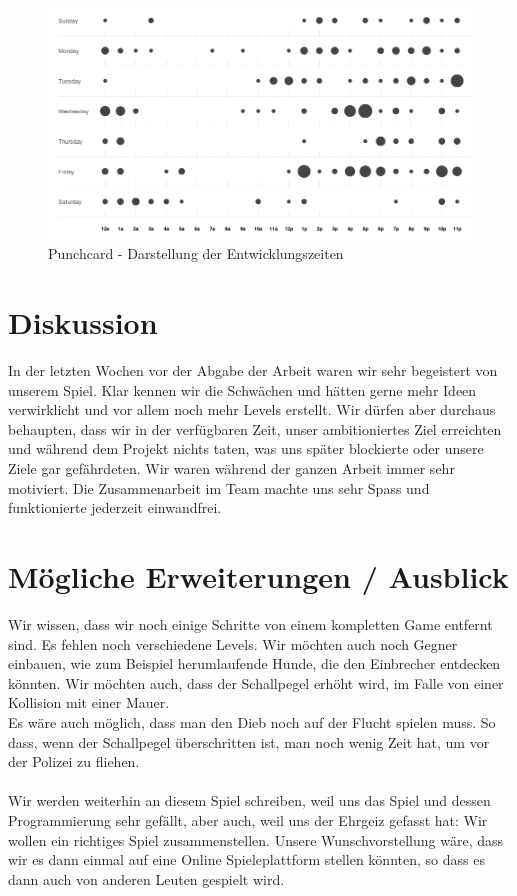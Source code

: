 \documentclass[11pt,a4paper]{scrbook}
\begin{document}
\begin{figure}[h]
\centering
\includegraphics[scale=0.4]{img/punchcard.png}
\caption{Punchcard - Darstellung der Entwicklungszeiten}
\label{fig:punchcard}
\end{figure}
 
\chapter{Diskussion}
In der letzten Wochen vor der Abgabe der Arbeit waren wir sehr begeistert von unserem Spiel. Klar kennen wir die Schwächen und hätten gerne mehr Ideen verwirklicht und vor allem noch mehr Levels erstellt. Wir dürfen aber durchaus behaupten, dass wir in der verfügbaren Zeit, unser ambitioniertes Ziel erreichten und während dem Projekt nichts taten, was uns später blockierte oder unsere Ziele gar gefährdeten. Wir waren während der ganzen Arbeit immer sehr motiviert. Die Zusammenarbeit im Team machte uns sehr Spass und funktionierte jederzeit einwandfrei. 


\chapter{Mögliche Erweiterungen / Ausblick}
Wir wissen, dass wir noch einige Schritte von einem kompletten Game entfernt sind. Es fehlen noch verschiedene Levels. Wir möchten auch noch Gegner einbauen, wie zum Beispiel herumlaufende Hunde, die den Einbrecher entdecken könnten. Wir möchten auch, dass der Schallpegel erhöht wird, im Falle von einer Kollision mit einer Mauer.     
\\
Es wäre auch möglich, dass man den Dieb noch auf der Flucht spielen muss. So dass, wenn der Schallpegel überschritten ist, man noch wenig Zeit hat, um vor der Polizei zu fliehen.
\\      
\\     
Wir werden weiterhin an diesem Spiel schreiben, weil uns das Spiel und dessen Programmierung sehr gefällt, aber auch, weil uns der Ehrgeiz gefasst hat: Wir wollen ein richtiges Spiel zusammenstellen. Unsere Wunschvorstellung wäre, dass wir es dann einmal auf eine Online Spieleplattform stellen könnten, so dass es dann auch von anderen Leuten gespielt wird.
\end{document}
